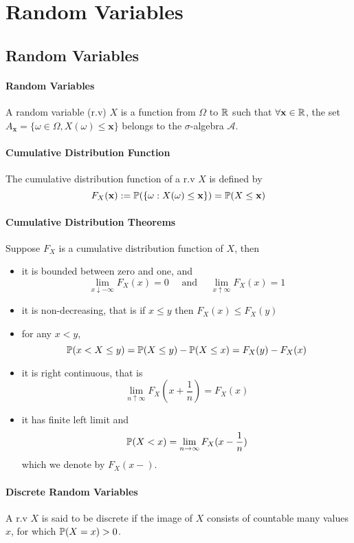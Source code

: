 \section{Random Variables}
\subsection{Random Variables}
\paragraph{Random Variables}
A random variable (r.v) \(X\) is a function from \(\Omega\) to \(\mathbb{R}\) such that \(\forall \mathbf{x} \in \mathbb{R}\), the set \(A_{\mathbf{x}} = \{\omega \in \Omega, X(\omega) \leq \mathbf{x}\}\) belongs to the \(\sigma\)-algebra \(\mathcal{A}\).

\paragraph{Cumulative Distribution Function}
The cumulative distribution function of a r.v \(X\) is defined by
\[F_X(\mathbf{x}) := \mathbb{P}(\{\omega: X(\omega) \leq \mathbf{x} \}) = \mathbb{P}(X \leq \mathbf{x})\]

\paragraph{Cumulative Distribution Theorems}
Suppose \(F_X\) is a cumulative distribution function of \(X\), then
\begin{itemize}
    \item it is bounded between zero and one, and 
    \[\lim_{x \downarrow -\infty} F_X(x) = 0 \quad \text{ and } \quad \lim_{x \uparrow \infty} F_X(x) = 1\]
    \item it is non-decreasing, that is if \(x \leq y\) then \(F_X(x) \leq F_X(y)\)
    \item for any \(x < y\),
    \[\mathbb{P}(x < X \leq y) = \mathbb{P}(X \leq y) - \mathbb{P}(X \leq x) = F_X(y) - F_X(x)\]
    \item it is right continuous, that is 
    \[\lim_{n \uparrow \infty} F_X(x + \frac{1}{n}) = F_X(x)\]
    \item it has finite left limit and 
    \[\mathbb{P}(X < x) = \lim_{n \to \infty} F_X(x - \frac{1}{n})\]
    which we denote by \(F_X(x-)\).
\end{itemize}

\paragraph{Discrete Random Variables}
A r.v \(X\) is said to be discrete if the image of \(X\) consists of countable many values \(x\), for which \(\mathbb{P}(X = x) > 0\).

